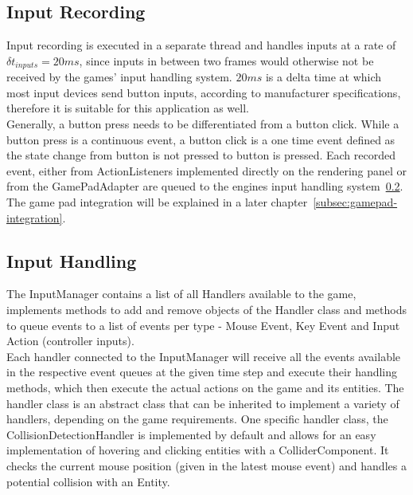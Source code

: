 \subsection{Input Recording}\label{subsec:input-recording}
Input recording is executed in a separate thread and handles inputs at a rate of $\delta t_{inputs} = 20 ms$, since inputs in between two frames
would otherwise not be received by the games' input handling system.
$20 ms$ is a delta time at which most input devices send button inputs, according to manufacturer specifications, therefore it is suitable for this application as well. 
\\
Generally, a button press needs to be differentiated from a button click.
While a button press is a continuous event, a button click is a one time event defined as the state change from button is not pressed to button is pressed.
Each recorded event, either from ActionListeners implemented directly on the rendering panel or from the GamePadAdapter are queued to the engines input handling system~\ref{subsec:input-handling}.
\\
The game pad integration will be explained in a later chapter~\ref{subsec:gamepad-integration}.
\subsection{Input Handling}\label{subsec:input-handling}
The InputManager contains a list of all Handlers available to the game, implements methods to add and remove objects of the Handler class and methods to queue events
to a list of events per type - Mouse Event, Key Event and Input Action (controller inputs).
\\
Each handler connected to the InputManager will receive all the events available in the respective event queues at the given time step and execute their handling methods, which
then execute the actual actions on the game and its entities.
The handler class is an abstract class that can be inherited to implement a variety of handlers, depending on the game requirements.
One specific handler class, the CollisionDetectionHandler is implemented by default and allows for an easy implementation of hovering and clicking entities with a ColliderComponent.
It checks the current mouse position (given in the latest mouse event) and handles a potential collision with an Entity.


